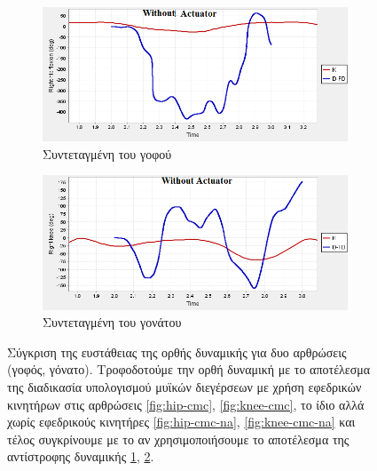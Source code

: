 \begin{figure}[H]
    \centering
    \begin{subfigure}[t]{.48\textwidth}
        \includegraphics[width=\textwidth, keepaspectratio]{fig/hip-ik-id.png}
        \caption{Συντεταγμένη του γοφού}
        \label{fig:hip-id}
    \end{subfigure}
    \begin{subfigure}[t]{.48\textwidth}
        \includegraphics[width=\textwidth, keepaspectratio]{fig/knee-ik-id.png}
        \caption{Συντεταγμένη του γονάτου}
        \label{fig:knee-id}
    \end{subfigure}
    \caption{Σύγκριση της ευστάθειας της ορθής δυναμικής για δυο αρθρώσεις (γοφός, γόνατο). Τροφοδοτούμε την ορθή δυναμική με το αποτέλεσμα της διαδικασία υπολογισμού μυϊκών διεγέρσεων με χρήση εφεδρικών κινητήρων στις αρθρώσεις \ref{fig:hip-cmc}, \ref{fig:knee-cmc}, το ίδιο αλλά χωρίς εφεδρικούς κινητήρες \ref{fig:hip-cmc-na}, \ref{fig:knee-cmc-na} και τέλος συγκρίνουμε με το αν χρησιμοποιήσουμε το αποτέλεσμα της αντίστροφης δυναμικής \ref{fig:hip-id}, \ref{fig:knee-id}.}
    \label{fig:fd-cmc-id}
\end{figure}

